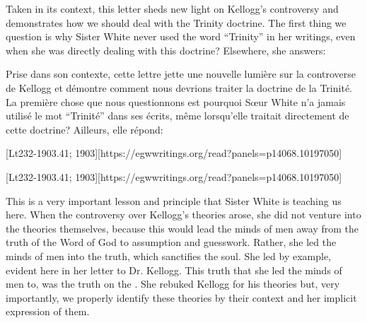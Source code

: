 Taken in its context, this letter sheds new light on Kellogg’s controversy and demonstrates how we should deal with the Trinity doctrine. The first thing we question is why Sister White never used the word “Trinity” in her writings, even when she was directly dealing with this doctrine? Elsewhere, she answers:


Prise dans son contexte, cette lettre jette une nouvelle lumière sur la controverse de Kellogg et démontre comment nous devrions traiter la doctrine de la Trinité. La première chose que nous questionnons est pourquoi Sœur White n'a jamais utilisé le mot “Trinité” dans ses écrits, même lorsqu'elle traitait directement de cette doctrine? Ailleurs, elle répond:


[Lt232-1903.41; 1903][https://egwwritings.org/read?panels=p14068.10197050]


[Lt232-1903.41; 1903][https://egwwritings.org/read?panels=p14068.10197050]


This is a very important lesson and principle that Sister White is teaching us here. When the controversy over Kellogg’s theories arose, she did not venture into the theories themselves, because this would lead the minds of men away from the truth of the Word of God to assumption and guesswork. Rather, she led the minds of men into the truth, which sanctifies the soul. She led by example, evident here in her letter to Dr. Kellogg. This truth that she led the minds of men to, was the truth on the . She rebuked Kellogg for his theories but, very importantly, we properly identify these theories by their context and her implicit expression of them.


